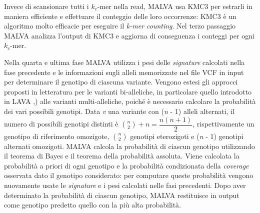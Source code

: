 \documentclass[../main.tex]{subfiles}
\begin{document}
Invece di scansionare tutti i \textit{${k}_{c}$}-mer nella read, MALVA usa KMC3 \cite{Kokot2017KMC3} per estrarli in maniera efficiente e effettuare il conteggio delle loro occorrenze: KMC3 è un algoritmo molto efficacie per eseguire il \textit{k-mer counting}. Nel terzo passaggio MALVA analizza l'output di KMC3 e aggiorna di conseguenza i conteggi per ogni \textit{${k}_{c}$}-mer.


Nella quarta e ultima fase MALVA utilizza i pesi delle \textit{signature} calcolati nella fase precedente e le informazioni sugli alleli memorizzate nel file VCF in input per determinare il genotipo di ciascuna variante. Vengono estesi gli approcci proposti in letteratura per le varianti bi-alleliche, in particolare quello introdotto in LAVA \cite{shajii2016lava},) alle varianti multi-alleliche, poiché è necessario calcolare la probabilità dei vari possibili genotipi. Data \textit{v} una variante con (\textit{n} - 1) alleli alternati, il numero di possibili genotipi distinti è $\binom{n}{2} + n = \dfrac{n(n+1)}{2}$, rispettivamente un genotipo di riferimento omozigote, $\binom{n}{2}$ genotipi eterozigoti e (\textit{n} - 1) genotipi alternati omozigoti. MALVA calcola la probabilità di ciascun genotipo utilizzando il teorema di Bayes e il teorema della probabilità assoluta. Viene calcolata la probabilità a priori di ogni genotipo e la probabilità condizionata della \textit{coverage} osservata
dato il genotipo considerato: per computare queste probabilità vengono nuovamente usate le \textit{signature} e i pesi calcolati nelle fasi precedenti. Dopo aver determinato la probabilità di ciascun genotipo, MALVA restituisce in output come genotipo predetto quello con la più alta probabilità.
\end{document}
